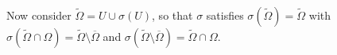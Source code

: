 \documentclass[reqno,12pt,twoside]{amsart}
\numberwithin{equation}{section} \numberwithin{theorem}{section}
\numberwithin{proposition}{section} \numberwithin{lemma}{section}
\numberwithin{corollary}{section}
\numberwithin{definition}{section} \numberwithin{remark}{section}
\begin{document}
Now consider $\widetilde{\Omega} =U\cup \sigma(U)$,
so that $\sigma$ satisfies $\sigma (\widetilde{\Omega})= \widetilde{\Omega}$ with $\sigma(\widetilde{\Omega} \cap \Omega) = \widetilde{\Omega} \setminus \overline{\Omega}$ and $\sigma(\widetilde{\Omega} \setminus \overline{\Omega}) = \widetilde{\Omega} \cap \Omega$. 
%
%
%
%
%
%
\end{document}

